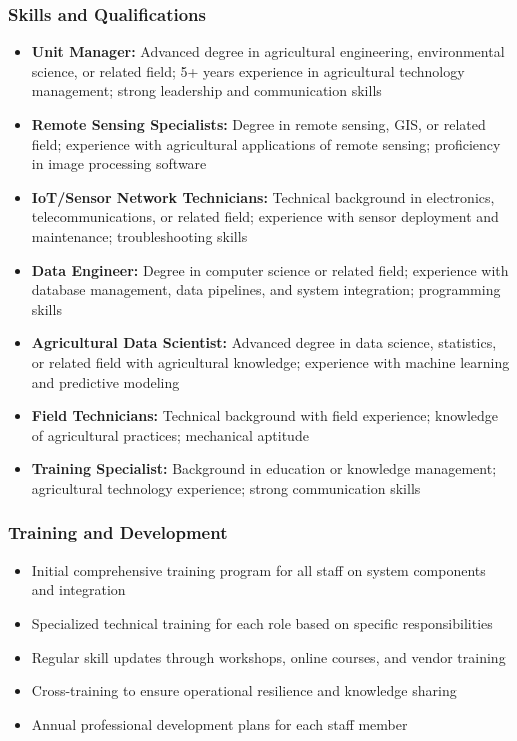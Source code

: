 \subsubsection{Skills and Qualifications}
\begin{itemize}
    \item \textbf{Unit Manager:} Advanced degree in agricultural engineering, environmental science, or related field; 5+ years experience in agricultural technology management; strong leadership and communication skills
    
    \item \textbf{Remote Sensing Specialists:} Degree in remote sensing, GIS, or related field; experience with agricultural applications of remote sensing; proficiency in image processing software
    
    \item \textbf{IoT/Sensor Network Technicians:} Technical background in electronics, telecommunications, or related field; experience with sensor deployment and maintenance; troubleshooting skills
    
    \item \textbf{Data Engineer:} Degree in computer science or related field; experience with database management, data pipelines, and system integration; programming skills
    
    \item \textbf{Agricultural Data Scientist:} Advanced degree in data science, statistics, or related field with agricultural knowledge; experience with machine learning and predictive modeling
    
    \item \textbf{Field Technicians:} Technical background with field experience; knowledge of agricultural practices; mechanical aptitude
    
    \item \textbf{Training Specialist:} Background in education or knowledge management; agricultural technology experience; strong communication skills
\end{itemize}

\subsubsection{Training and Development}
\begin{itemize}
    \item Initial comprehensive training program for all staff on system components and integration
    \item Specialized technical training for each role based on specific responsibilities
    \item Regular skill updates through workshops, online courses, and vendor training
    \item Cross-training to ensure operational resilience and knowledge sharing
    \item Annual professional development plans for each staff member
\end{itemize}

